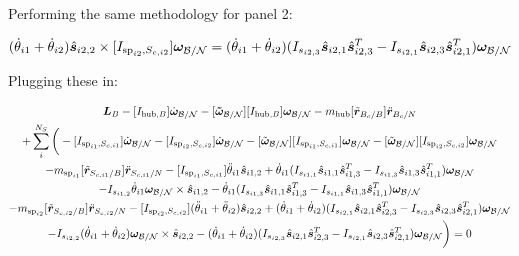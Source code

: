 \documentclass[paper]{aiaaNew}
\begin{document}
Performing the same methodology for panel 2:

\begin{equation}
(\dot{\theta}_{i1}  + \dot{\theta}_{i2})\hat{\bm s}_{i2,2} \times [I_{\text{sp}_{i2},S_{c,i2}}] \bm \omega_{\cal{B/N}} = (\dot{\theta}_{i1}  + \dot{\theta}_{i2}) (I_{s_{i2,3}} \hat{\bm s}_{i2,1} \hat{\bm s}_{i2,3}^T - I_{s_{i2,1}} \hat{\bm s}_{i2,3} \hat{\bm s}_{i2,1}^T) \bm \omega_{\cal{B/N}}
\end{equation}

Plugging these in:

\begin{multline}
\bm L_B -[I_{\text{hub},B}] \dot{\bm\omega}_{\cal B/N}  -[\bm{\tilde{\omega}}_{\cal B/N}] [I_{\text{hub},B}] \bm\omega_{\cal B/N} - m_{\text{hub}} [\tilde{{\bm r}}_{B_c/B}] \ddot{\bm r}_{B_c/N} \\
+ \sum\limits_{i}^{N_S}\bigg(-[I_{\text{sp}_{i1},S_{c,i1}}] \dot{\bm \omega}_{\cal{B/N}} -[I_{\text{sp}_{i2},S_{c,i2}}] \dot{\bm \omega}_{\cal{B/N}} -[\tilde{\bm \omega}_{\cal{B/N}}] [I_{\text{sp}_{i1},S_{c,i1}}] \bm \omega_{\cal{B/N}}-[\tilde{\bm \omega}_{\cal{B/N}}] [I_{\text{sp}_{i2},S_{c,i2}}] \bm \omega_{\cal{B/N}}\\
- m_{\text{sp}_{i1}} [\tilde{{\bm r}}_{S_{c,i1}/B}] \ddot{\bm r}_{S_{c,i1}/N} -[I_{\text{sp}_{i1},S_{c,i1}}] \ddot{\theta}_{i1} \hat{\bm s}_{i1,2} +\dot{\theta}_{i1} (I_{s_{i1,1}} \hat{\bm s}_{i1,1} \hat{\bm s}_{i1,3}^T - I_{s_{i1,3}} \hat{\bm s}_{i1,3} \hat{\bm s}_{i1,1}^T) \bm \omega_{\cal{B/N}}\\
-I_{s_{i1,2}} \dot{\theta}_{i1} \bm \omega_{\cal{B/N}} \times \hat{\bm s}_{i1,2} -\dot{\theta}_{i1} (I_{s_{i1,3}} \hat{\bm s}_{i1,1} \hat{\bm s}_{i1,3}^T - I_{s_{i1,1}} \hat{\bm s}_{i1,3} \hat{\bm s}_{i1,1}^T) \bm \omega_{\cal{B/N}}\\
- m_{\text{sp}_{i2}} [\tilde{{\bm r}}_{S_{c,i2}/B}] \ddot{\bm r}_{S_{c,i2}/N} -[I_{\text{sp}_{i2},S_{c,i2}}] (\ddot{\theta}_{i1}  + \ddot{\theta}_{i2})\hat{\bm s}_{i2,2} +(\dot{\theta}_{i1}  + \dot{\theta}_{i2}) (I_{s_{i2,1}} \hat{\bm s}_{i2,1} \hat{\bm s}_{i2,3}^T - I_{s_{i2,3}} \hat{\bm s}_{i2,3} \hat{\bm s}_{i2,1}^T) \bm \omega_{\cal{B/N}} \\
-I_{s_{i2,2}}  (\dot{\theta}_{i1}  + \dot{\theta}_{i2}) \bm \omega_{\cal{B/N}} \times \hat{\bm s}_{i2,2} -(\dot{\theta}_{i1}  + \dot{\theta}_{i2}) (I_{s_{i2,3}} \hat{\bm s}_{i2,1} \hat{\bm s}_{i2,3}^T - I_{s_{i2,1}} \hat{\bm s}_{i2,3} \hat{\bm s}_{i2,1}^T) \bm \omega_{\cal{B/N}}\bigg) = 0
\end{multline}
\end{document}
